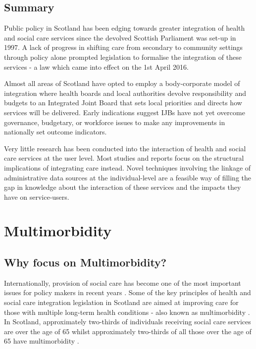 \documentclass[12pt,]{report}
\begin{document}
\subsection{Summary}\label{subsec:hsc-interaction-summary}

Public policy in Scotland has been edging towards greater integration of
health and social care services since the devolved Scottish Parliament
was set-up in 1997. A lack of progress in shifting care from secondary
to community settings through policy alone prompted legislation to
formalise the integration of these services - a law which came into
effect on the 1st April 2016.

Almost all areas of Scotland have opted to employ a body-corporate model
of integration where health boards and local authorities devolve
responsibility and budgets to an Integrated Joint Board that sets local
priorities and directs how services will be delivered. Early indications
suggest IJBs have not yet overcome governance, budgetary, or workforce
issues to make any improvements in nationally set outcome indicators.

Very little research has been conducted into the interaction of health
and social care services at the user level. Most studies and reports
focus on the structural implications of integrating care instead. Novel
techniques involving the linkage of administrative data sources at the
individual-level are a feasible way of filling the gap in knowledge
about the interaction of these services and the impacts they have on
service-users.

\section{Multimorbidity}\label{sec:mm}

\subsection{Why focus on Multimorbidity?}\label{subsec:why-mm}

Internationally, provision of social care has become one of the most
important issues for policy makers in recent years \citep{RN406, RN250}.
Some of the key principles of health and social care integration
legislation in Scotland are aimed at improving care for those with
multiple long-term health conditions - also known as multimorbidity
\citep{RN266, RN251}. In Scotland, approximately two-thirds of
individuals receiving social care services are over the age of 65
\citep{RN128} whilst approximately two-thirds of all those over the age
of 65 have multimorbidity \citep{RN33}.
\end{document}
